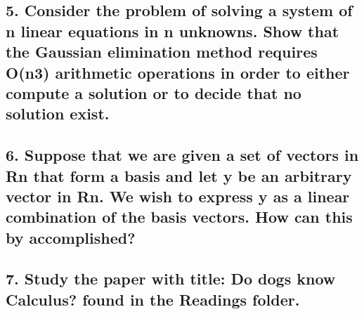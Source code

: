 \documentclass[12pt]{article}
\begin{document}
\vspace{2in}

\pagebreak


\subsection*{5. Consider the problem of solving a system of n linear equations in n unknowns. Show
that the Gaussian elimination method requires O(n3) arithmetic operations in order to either
compute a solution or to decide that no solution exist.}

\vspace{2in}

\pagebreak


\subsection*{6. Suppose that we are given a set of vectors in Rn that form a basis and let y be an
arbitrary vector in Rn. We wish to express y as a linear combination of the basis vectors. How
can this by accomplished?}

\vspace{2in}

\pagebreak


\subsection*{7. Study the paper with title: Do dogs know Calculus? found in the Readings folder.}

\vspace{2in}

\pagebreak
\end{document}
